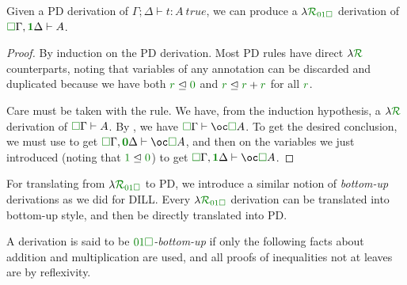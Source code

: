 \documentclass[submission,copyright,creativecommons]{eptcs}
\begin{document}
\begin{proposition}[PD $\to$ \name]
  Given a PD derivation of $\Gamma; \Delta \vdash t : A~\mathit{true}$, we can
  produce a $\name_{\instPD}$ derivation of
  $\ctx{\Gamma}{\vct\valid}, \ctx{\Delta}{\vct\true} \vdash A$.
\end{proposition}
\begin{proof}
  By induction on the PD derivation.
  Most PD rules have direct $\name$ counterparts, noting that variables of any
  annotation can be discarded and duplicated because we have both
  $\rescomment r \subres \rescomment 0$ and
  $\rescomment r \subres \rescomment r + \rescomment r$ for all
  $\rescomment r$.

  Care must be taken with the  rule.
  We have, from the induction hypothesis, a $\name$ derivation of
  $\ctx\Gamma{\vct\Box} \vdash A$.
  By , we have
  $\ctx\Gamma{\vct\Box} \vdash \excl\valid A$.
  To get the desired conclusion, we must use  to get
  $\ctx\Gamma{\vct\Box}, \ctx\Delta{\vct\unused} \vdash \excl\valid A$, and
  then  on the variables we just introduced (noting that
  $\true \subres \unused$) to get
  $\ctx\Gamma{\vct\Box}, \ctx\Delta{\vct\true} \vdash \excl\valid A$.
\end{proof}

For translating from $\name_{\instPD}$ to PD, we introduce a similar notion of
\emph{bottom-up} derivations as we did for DILL\@.
Every $\name_{\instPD}$ derivation can be translated into bottom-up style, and
then be directly translated into PD.

\begin{definition}
  A derivation is said to be \emph{$\instPD$-bottom-up} if only the following
  facts about addition and multiplication are used, and all proofs of
  inequalities not at leaves are by reflexivity.

\end{definition}
\end{document}
